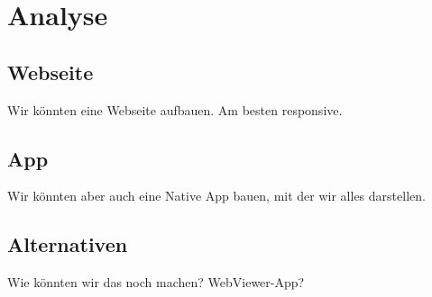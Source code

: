 \section{Analyse}

\subsection{Webseite}
Wir könnten eine Webseite aufbauen. Am besten responsive.

\subsection{App}
Wir könnten aber auch eine Native App bauen, mit der wir alles darstellen.

\subsection{Alternativen}
Wie könnten wir das noch machen? WebViewer-App?